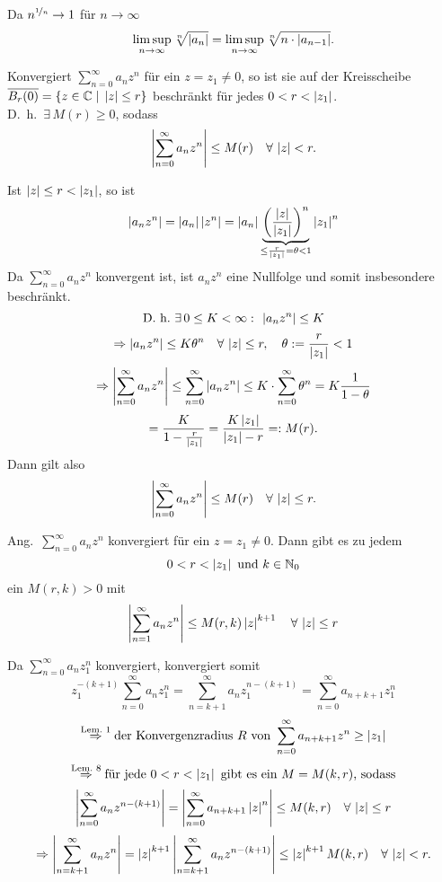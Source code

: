 \documentclass[../ana1.tex]{subfiles}
\begin{document}
\begin{bew}
    Da \( n^{\nicefrac{1}{n}} \rightarrow 1 \) für \( n\rightarrow \infty \)
    \[ \limsup\limits_{n\rightarrow\infty} \sqrt[n]{\left|a_n\right|} = \limsup\limits_{n\rightarrow\infty} \sqrt[n]{n \cdot \left|a_{n-1}\right|}. \]
\end{bew}
\begin{lem}
    Konvergiert \( \sum_{n=0}^\infty a_n z^n \) für ein \( z = z_1 \neq 0 \), 
    so ist sie auf der Kreisscheibe \( \overline{B_r (0)}  = \{ z\in\mathbb{C} \;\vert \; \left|z\right|\leq r \} \)
    beschränkt für jedes \( 0 < r < \left|z_1\right| \).\\
    D.\ h.\  \( \exists \, M(r) \geq 0 \), sodass
    \[ \left| \sum_{n=0}^\infty a_n z^n \right| \leq M(r) \quad \forall \, \left|z\right| < r. \]
\end{lem}
\begin{bew}
    Ist \( \left|z\right| \leq r < \left|z_1\right| \), so ist
    \[ \left|a_n z^n\right| = \left|a_n\right| \left|z^n\right| = \left|a_n\right| \underbrace{ {\left( \frac{\left|z\right|}{\left|z_1\right|} \right)}^n }_{\leq \frac{r}{\left|z_1\right|} = \theta < 1} \left|z_1\right|^n \]
    Da \( \sum_{n=0}^\infty a_n z^n \) konvergent ist, ist \( a_n z^n \) eine Nullfolge und somit insbesondere beschränkt.
    \[\text{D.\ h.\ } \exists \, 0 \leq K < \infty \,\colon \, \left|a_n z^n\right| \leq K \]
    \[ \Rightarrow \left|a_n z^n\right| \leq K \theta^n \quad \forall \, \left|z\right|\leq r, \quad \theta := \frac{r}{\left|z_1\right|} < 1 \]
    \[ \Rightarrow \left| \sum_{n=0}^\infty a_n z^n \right| \leq \sum_{n=0}^\infty \left|a_n z^n\right| \leq K \cdot \sum_{n=0}^\infty \theta^n = K \frac{1}{1 - \theta} \]
    \[ = \frac{K}{1 - \frac{r}{\left|z_1\right|}} = \frac{ K \left|z_1\right| }{\left|z_1\right| - r} =: M(r). \]
    Dann gilt also
    \[ \left| \sum_{n=0}^\infty a_n z^n \right| \leq M(r) \quad \forall \, \left|z\right| \leq r. \]
\end{bew}
\begin{kor}
    Ang.\  \( \sum_{n=0}^\infty a_n z^n \) konvergiert für ein \( z = z_1 \neq 0 \). Dann gibt es zu jedem
    \[ 0 < r < \left|z_1\right| \text{ und } k\in\mathbb{N}_0\]
    ein \( M(r,k) > 0 \) mit
    \[ \left| \sum_{n=1}^\infty a_n z^n \right| \leq M(r,k) \left|z\right|^{k+1} \quad \forall \, \left|z\right|\leq r \]
\end{kor}
\begin{bew}
    Da \( \sum_{n=0}^\infty a_n z_1^n \) konvergiert, konvergiert somit
    \[ z_1^{\minus(k+1)} \sum_{n=0}^\infty a_n z_1^n = \sum_{n=k+1}^\infty a_n z_1^{n-(k+1)} = \sum_{n=0}^\infty a_{n+k+1} z_1^n \]
    \[ \overset{\text{Lem.\ 1}}{\Rightarrow} \text{der Konvergenzradius } R \text{ von } \sum_{n=0}^\infty a_{n+k+1} z^n \geq \left|z_1\right| \]
    \[ \overset{\text{Lem.\ 8}}{\Rightarrow} \text{für jede } 0 < r < \left|z_1\right| \text{ gibt es ein } M = M(k,r) \text{, sodass} \]
    \[ \left| \sum_{n=0}^\infty a_n z^{n-(k+1)} \right| = \left| \sum_{n=0}^\infty a_{n+k+1} \left|z\right|^n \right| \leq M(k,r) \quad \forall \, \left|z\right| \leq r \]
    \[ \Rightarrow \left| \sum_{n=k+1}^\infty a_n z^n \right| = \left|z\right|^{k+1} \left| \sum_{n=k+1}^\infty a_n z^{n-(k+1)} \right| \leq \left|z\right|^{k+1} M(k,r) \quad \forall \, \left|z\right| < r. \]
\end{bew}
\end{document}
